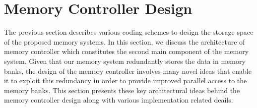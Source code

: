 \section{Memory Controller Design}
\label{sec:memcontrol}
The previous section describes various coding schemes to design the storage space of the proposed memory systems. In this section, we discuss the architecture of memory controller which constitutes the second main component of the memory system. Given that our memory system redundantly stores the data in memory banks, the design of the memory controller involves many novel ideas that enable it to exploit this redundancy in order to provide improved parallel access to the memory banks. This section presents these key architectural ideas behind the memory controller design along with various implementation related deails.

